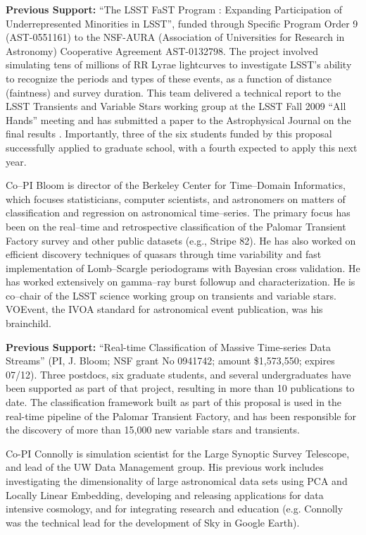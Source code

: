 {\bf Previous Support:} ``The LSST FaST Program : Expanding Participation of
Underrepresented Minorities in LSST'', funded through Specific Program Order 9
(AST-0551161) to the NSF-AURA (Association of Universities for Research in
Astronomy) Cooperative Agreement AST-0132798.  The project involved simulating
tens of millions of RR Lyrae lightcurves to investigate LSST's ability to
recognize the periods and types of these events, as a function of distance
(faintness) and survey duration.  This team delivered a technical report to the
LSST Transients and Variable Stars working group at the LSST Fall 2009 ``All
Hands'' meeting and has submitted a paper to the Astrophysical Journal on the
final results \citep{RRLyrae}. Importantly, three of the six students funded by
this proposal successfully applied to graduate school, with a fourth expected to
apply this next year.

 \smallskip

Co--PI Bloom is director of the Berkeley Center for Time--Domain Informatics,
which focuses statisticians, computer scientists, and astronomers on matters of
classification and regression on astronomical time--series.  The primary focus
has been on the real--time and retrospective classification of the Palomar
Transient Factory survey and other public datasets (e.g., Stripe 82). He has
also worked on efficient discovery techniques of quasars through time
variability and fast implementation of Lomb--Scargle periodograms with Bayesian
cross validation. He has worked extensively on gamma--ray burst followup and
characterization. He is co--chair of the LSST science working group on
transients and variable stars. VOEvent, the IVOA standard for astronomical event
publication, was his brainchild.

{\bf Previous Support:} ``Real-time Classification of Massive Time-series Data
Streams'' (PI, J. Bloom; NSF grant No 0941742; amount \$1,573,550; expires
07/12).  Three postdocs, six graduate students, and several undergraduates have
been supported as part of that project, resulting in more than 10 publications
to date.  The classification framework built as part of this proposal is used in
the real-time pipeline of the Palomar Transient Factory, and has been
responsible for the discovery of more than 15,000 new variable stars and
transients.

 \smallskip

Co-PI Connolly is simulation scientist for the Large Synoptic Survey Telescope,
and lead of the UW Data Management group.  His previous work includes
investigating the dimensionality of large astronomical data sets using PCA and
Locally Linear Embedding, developing and releasing applications for data
intensive cosmology, and for integrating research and education (e.g. Connolly
was the technical lead for the development of Sky in Google Earth).

